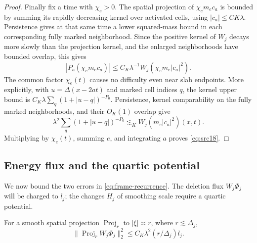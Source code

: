 \begin{proof}
Finally fix a time with $\chi_e>0$.  The spatial projection of
$\chi_em_ec_a$ is bounded by summing its rapidly decreasing kernel
over activated cells, using $|c_a|\leq CK\lambda$.
Persistence gives at that same time a lower squared-mass bound in
each corresponding fully marked neighborhood.  Since the positive
kernel of $W_j$ decays more slowly than the projection kernel, and
the enlarged neighborhoods have bounded overlap, this gives
\[
 |P_a(\chi_em_ec_a)|
 \leq C_K\lambda^{-1}W_j(\chi_em_e|c_a|^2).
\]
The common factor $\chi_e(t)$ causes no difficulty even near slab
endpoints.  More explicitly, with $u=\Delta(x-2at)$ and marked
cell indices $q$, the kernel upper bound is
$C_K\lambda\sum_q(1+|u-q|)^{-P_0}$.
Persistence, kernel comparability on the fully marked neighborhoods,
and their $O_K(1)$ overlap give
\[
 \lambda^2\sum_q(1+|u-q|)^{-P_0}
 \lesssim_K W_j(m_e|c_a|^2)(x,t).
\]
Multiplying by $\chi_e(t)$, summing $e$, and integrating $a$ proves
\eqref{eq:src18}.
\end{proof}

\subsection{Energy flux and the quartic potential}

We now bound the two errors in \eqref{eq:frame-recurrence}.
The deletion flux $W_j\Phi_j$ will be charged to $l_j$; the changes
$H_j$ of smoothing scale require a quartic potential.

\begin{lemma}\label{lem:frame-flux}
For a smooth spatial projection $\operatorname{Proj}_r$ to
$|\xi|\asymp r$, where $r\lesssim\Delta_j$,
\begin{equation}\label{eq:src20}
 \|\operatorname{Proj}_rW_j\Phi_j\|_2^2
 \leq C_K\lambda^2(r/\Delta_j)l_j.
\end{equation}
\end{lemma}

